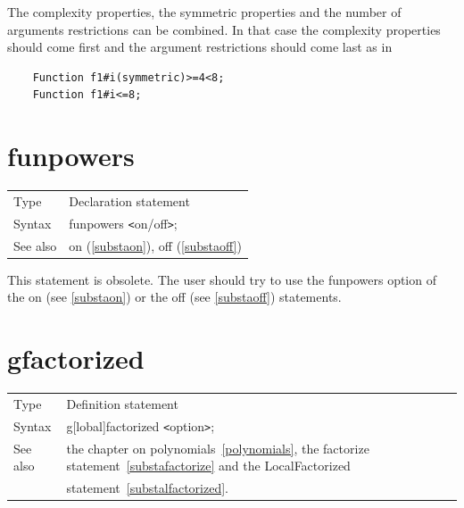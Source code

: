 \vspace{2mm}

\noindent The complexity properties, the symmetric properties and the 
number of arguments restrictions can be 
combined. In that case the complexity properties should come first and the 
argument restrictions should come last as in
\begin{verbatim}
    Function f1#i(symmetric)>=4<8;
    Function f1#i<=8;
\end{verbatim}
\vspace{10mm}


\section{funpowers}
\label{substafunpowers}

\noindent \begin{tabular}{ll}
Type & Declaration statement\\
Syntax & funpowers {\tt<}on/off{\tt>};
\\ See also & on (\ref{substaon}), off (\ref{substaoff})
\end{tabular} \vspace{4mm}

\noindent This statement is obsolete. The 
user should try to use the funpowers option of the on (see 
\ref{substaon}) or the off (see \ref{substaoff}) statements. 
\vspace{10mm}


\section{gfactorized}
\label{substagfactorized}

\noindent \begin{tabular}{ll}
Type & Definition statement\\
Syntax & g[lobal]factorized {\tt<}option{\tt>};
\\ See also & the chapter on polynomials~\ref{polynomials}, the 
factorize statement~\ref{substafactorize} and the LocalFactorized \\ &
statement~\ref{substalfactorized}.\hfill
\end{tabular}
\smallskip

